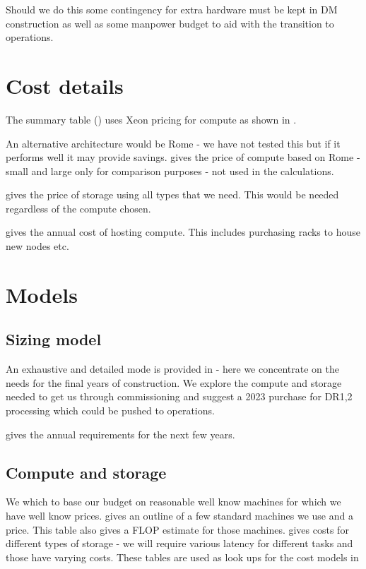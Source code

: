 

Should we do this some contingency for extra hardware must be kept in DM construction as well as some manpower
budget to aid with the transition to operations.



\section{Cost details}
The summary table ()  uses Xeon pricing for compute as shown in
.


An alternative architecture would be Rome - we have not tested this but if it performs well it may provide savings.
 gives the price of compute based on Rome -small and large only for comparison purposes - not used in
the calculations.


 gives the price of storage using all  types that we need.
This would be needed regardless of the compute chosen.


 gives the annual cost of hosting compute. This includes purchasing racks to house
new nodes etc.





\section{ Models}\label{sec:model}
\subsection{Sizing model}\label{sec:sizemodel}

An exhaustive and detailed mode is provided in   - here we concentrate on the needs for the
final years of construction. We explore the compute and storage needed to get us through commissioning and suggest a 2023 purchase for DR1,2 processing which could be pushed to operations.

 gives the annual requirements for the next few years.



\subsection{Compute and storage }\label{sec:csmodel}
We which to base our budget on reasonable well know machines for which we have well know prices.
 gives an outline of a few standard machines we use and a price. This table also gives a FLOP estimate
for those machines.
 gives costs for different types of storage - we will require various latency for different tasks
and those have varying costs.
These tables are used as look ups for the cost models in 

